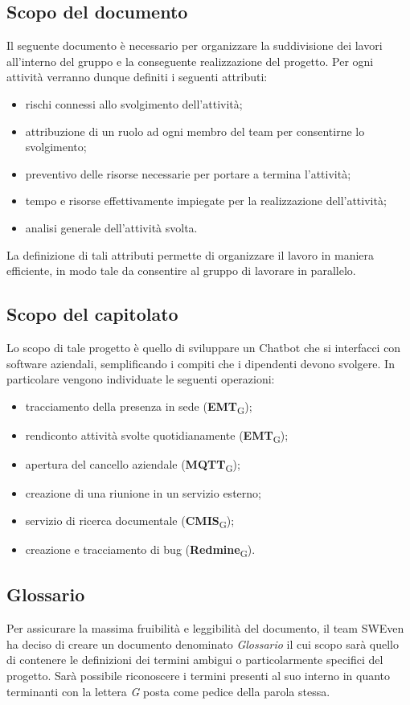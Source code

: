 \subsection{Scopo del documento}
Il seguente documento è necessario per organizzare la suddivisione dei lavori all'interno del gruppo e la conseguente realizzazione del progetto. Per ogni attività verranno dunque definiti i seguenti attributi: 
\begin{itemize}
    \item rischi connessi allo svolgimento dell'attività;
    \item attribuzione di un ruolo ad ogni membro del team per consentirne lo svolgimento;
    \item preventivo delle risorse necessarie per portare a termina l'attività;
    \item tempo e risorse effettivamente impiegate per la realizzazione dell'attività;
    \item analisi generale dell'attività svolta.
\end{itemize}
La definizione di tali attributi permette di organizzare il lavoro in maniera efficiente, in modo tale da consentire al gruppo di lavorare in parallelo. 

\subsection{Scopo del capitolato}
Lo scopo di tale progetto è quello di sviluppare un Chatbot che si interfacci con software aziendali, semplificando i compiti che i dipendenti devono svolgere. 
In particolare vengono individuate le seguenti operazioni: 
\begin{itemize}
    \item tracciamento della presenza in sede (\textbf{EMT}\textsubscript{G});
    \item rendiconto attività svolte quotidianamente (\textbf{EMT}\textsubscript{G});
    \item apertura del cancello aziendale (\textbf{MQTT}\textsubscript{G});
    \item creazione di una riunione in un servizio esterno;
    \item servizio di ricerca documentale (\textbf{CMIS}\textsubscript{G});
    \item creazione e tracciamento di bug (\textbf{Redmine}\textsubscript{G}).
\end{itemize}

\subsection{Glossario}
Per assicurare la massima fruibilità e leggibilità del documento, il team SWEven ha deciso di creare un documento denominato \textit{Glossario} il cui scopo sarà quello di contenere le definizioni dei termini ambigui o particolarmente specifici del progetto. Sarà possibile riconoscere i termini presenti al suo interno in quanto terminanti con la lettera \textit{G} posta come pedice della parola stessa. 
